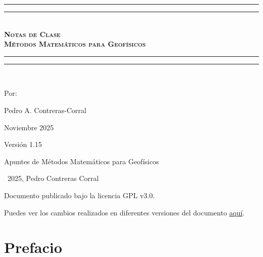 \documentclass[letterpaper,12pt, twoside]{book}
\newlength{\drop}
\theoremstyle{definition}
\begin{document}
\newpage

\thispagestyle{empty}


\newpage

\begin{titlepage}
 \textheight
    \centering
    \vspace*{\baselineskip}
    \rule{\textwidth}{1.6pt}\vspace*{-\baselineskip}\vspace*{2pt}
    \rule{\textwidth}{0.4pt}\\[\baselineskip]
    {\scshape\bfseries\Huge{}\selectfont Notas de Clase} \\[0.2\baselineskip]
    {\scshape\bfseries\Huge{}\selectfont Métodos Matemáticos para Geofísicos} \\[0.2\baselineskip]
    \rule{\textwidth}{0.4pt}\vspace*{-\baselineskip}\vspace{3.2pt}
    \rule{\textwidth}{1.6pt}\\[\baselineskip]
    {\Large Por: \par}
{\large Pedro A. Contreras-Corral \par}
{\large Noviembre 2025 \par}
\vfill
{\large Versión 1.15 \par}
\end{titlepage}

\mbox{} 
\vfill
Apuntes de Métodos Matemáticos para Geofísicos 

\textcopyright\ 2025, Pedro Contreras Corral %



Documento publicado bajo la licencia GPL v3.0.

Puedes ver los cambios realizados en diferentes versiones del documento \href{https://github.com/Pedroga-cc/MMG/blob/main/changelog.txt}{aquí}.


\vspace{1cm} 

\restoregeometry

\chapter*{Prefacio}
\end{document}
